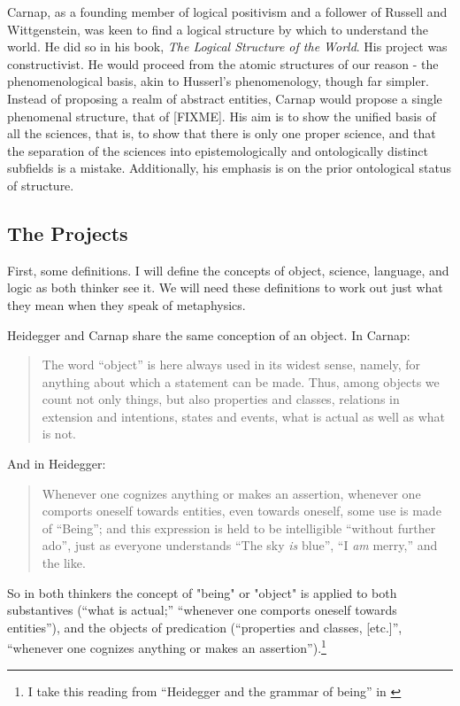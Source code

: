 \documentclass[leqno, 12pt]{turabian-researchpaper}
\begin{document}
	Carnap, as a founding member of logical positivism and a follower of Russell
	and Wittgenstein, was keen to find a logical structure by which to understand the
	world. He did so in his book, \textit{The Logical Structure of the World}. His
	project was constructivist. He would proceed from the atomic structures of our
	reason - the phenomenological basis, akin to Husserl's phenomenology, though
	far simpler. Instead of proposing a realm of abstract entities, Carnap would
	propose a single phenomenal structure, that of [FIXME]. His aim is to show the
	unified basis of all the sciences, that is, to show that there is only one
	proper science, and that the separation of the sciences into epistemologically
	and ontologically distinct subfields is a mistake. Additionally, his emphasis is
	on the prior ontological status of structure.

	\subsection{The Projects}

	First, some definitions. I will define the concepts of object, science,
	language, and logic as both thinker see it. We will need these definitions to
	work out just what they mean when they speak of metaphysics.

	Heidegger and Carnap share the same conception of an object. In Carnap:
	\blockquote[{\cite[5]{carnap2003}}]{The word \enquote{object} is here always used in its widest sense, namely, for anything about which a statement can be made. Thus, among objects we count not only things, but also properties and classes, relations in extension and intentions, states and events, what is actual as well as what is not.}
	And in Heidegger: \blockquote[{\cite[5]{heidegger2008b}}]{Whenever one cognizes anything or makes an assertion, whenever one comports oneself towards entities, even towards oneself, some use is made of \enquote{Being}; and this expression is held to be intelligible \enquote{without further ado}, just as everyone understands \enquote{The sky \emph{is} blue}, \enquote{I \emph{am} merry,} and the like.}
	So in both thinkers the concept of "being" or "object" is applied to both substantives
	(\enquote{what is actual;} \enquote{whenever one comports oneself towards entities}),
	and the objects of predication (\enquote{properties and classes, [etc.]}, \enquote{whenever one cognizes anything or makes an assertion}).\footnote{I
	take this reading from \enquote{Heidegger and the grammar of being} in \cite[chap.
	15]{priest2002}}
\end{document}
